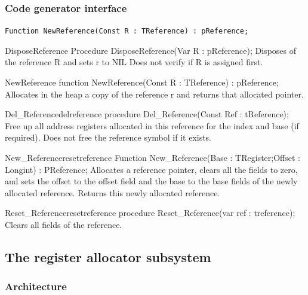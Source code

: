 \documentclass [12pt]{article}
\begin{document}
\subsubsection{Code generator interface}
\label{subsubsec:mylabel28}

\lstinline!Function NewReference(Const R : TReference) : pReference;!

\begin{procedure}{DisposeReference}
\Declaration
Procedure DisposeReference(Var R : pReference);
\Description 
Disposes of the reference \textsf{R} and sets r to \textsf{NIL} 
\Notes 
Does not verify if \textsf{R} is assigned first. 
\end{procedure}

\begin{function}{NewReference}
\Declaration
function NewReference(Const R : TReference) : pReference;
\Description 
Allocates in the heap a copy of the reference \textsf{r} and returns that
allocated pointer.
\end{function}

\begin{functionl}{Del{\_}Reference}{delreference}
\Declaration
procedure Del{\_}Reference(Const Ref : tReference);
\Description 
Free up all address registers allocated in this reference for the index and
base (if required). 
\Notes 
Does not free the reference symbol if it exists. 
\end{functionl}

\begin{functionl}{New{\_}Reference}{resetreference}
\Declaration
Function New{\_}Reference(Base : TRegister;Offset : Longint) : PReference;
\Description 
Allocates a reference pointer, clears all the fields to zero, and sets the
offset to the offset field and the base to the base fields of the newly
allocated reference. Returns this newly allocated reference. 
\end{functionl}

\begin{procedurel}{Reset{\_}Reference}{resetreference}
\Declaration
procedure Reset{\_}Reference(var ref : treference);
\Description 
Clears all fields of the reference. 
\end{procedurel}

\subsection{The register allocator subsystem}
\label{subsec:mylabel7}

\subsubsection{Architecture}
\label{subsubsec:architecture}
\end{document}
